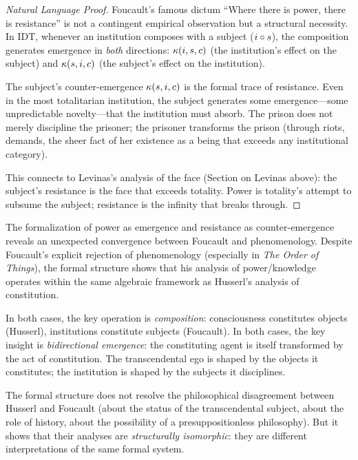 \begin{proof}[Natural Language Proof]
Foucault's famous dictum ``Where there is power, there is resistance''
is not a contingent empirical observation but a structural necessity.
In IDT, whenever an institution composes with a subject ($i \circ s$),
the composition generates emergence in \emph{both} directions:
$\kappa(i, s, c)$ (the institution's effect on the subject) and
$\kappa(s, i, c)$ (the subject's effect on the institution).

The subject's counter-emergence $\kappa(s, i, c)$ is the formal trace
of resistance.  Even in the most totalitarian institution, the subject
generates some emergence---some unpredictable novelty---that the
institution must absorb.  The prison does not merely discipline the
prisoner; the prisoner transforms the prison (through riots, demands,
the sheer fact of her existence as a being that exceeds any institutional
category).

This connects to Levinas's analysis of the face (Section on Levinas above):
the subject's resistance is the face that exceeds totality.  Power is
totality's attempt to subsume the subject; resistance is the infinity
that breaks through.
\end{proof}

\begin{interpretation}
\label{interp:foucault-phenom}
The formalization of power as emergence and resistance as counter-emergence
reveals an unexpected convergence between Foucault and phenomenology.
Despite Foucault's explicit rejection of phenomenology (especially in
\textit{The Order of Things}), the formal structure shows that his analysis
of power/knowledge operates within the same algebraic framework as
Husserl's analysis of constitution.

In both cases, the key operation is \emph{composition}: consciousness
constitutes objects (Husserl), institutions constitute subjects (Foucault).
In both cases, the key insight is \emph{bidirectional emergence}: the
constituting agent is itself transformed by the act of constitution.
The transcendental ego is shaped by the objects it constitutes; the
institution is shaped by the subjects it disciplines.

The formal structure does not resolve the philosophical disagreement
between Husserl and Foucault (about the status of the transcendental
subject, about the role of history, about the possibility of a
presuppositionless philosophy).  But it shows that their analyses
are \emph{structurally isomorphic}: they are different interpretations
of the same formal system.
\end{interpretation}

